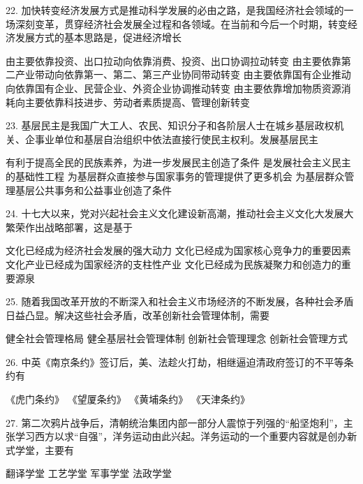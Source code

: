 22. 加快转变经济发展方式是推动科学发展的必由之路，是我国经济社会领域的一场深刻变革，贯穿经济社会发展全过程和各领域。在当前和今后一个时期，转变经济发展方式的基本思路是，促进经济增长
\begin{choices}
	 由主要依靠投资、出口拉动向依靠消费、投资、出口协调拉动转变
	 由主要依靠第二产业带动向依靠第一、第二、第三产业协同带动转变
	 由主要依靠国有企业推动向依靠国有企业、民营企业、外资企业协调推动转变
	 由主要依靠增加物质资源消耗向主要依靠科技进步、劳动者素质提高、管理创新转变
\end{choices}

23. 基层民主是我国广大工人、农民、知识分子和各阶层人士在城乡基层政权机关、企事业单位和基层自治组织中依法直接行使民主权利。发展基层民主
\begin{choices}
	 有利于提高全民的民族素养，为进一步发展民主创造了条件
	 是发展社会主义民主的基础性工程
	 为基层群众直接参与国家事务的管理提供了更多机会
	 为基层群众管理基层公共事务和公益事业创造了条件
\end{choices}

24. 十七大以来，党对兴起社会主义文化建设新高潮，推动社会主义文化大发展大繁荣作出战略部署，这是基于
\begin{choices}
	 文化已经成为经济社会发展的强大动力
	 文化已经成为国家核心竞争力的重要因素
	 文化产业已经成为国家经济的支柱性产业
	 文化已经成为民族凝聚力和创造力的重要源泉
\end{choices}

25. 随着我国改革开放的不断深入和社会主义市场经济的不断发展，各种社会矛盾日益凸显。解决这些社会矛盾，改革创新社会管理体制，需要
\begin{choices}
	 健全社会管理格局
	 健全基层社会管理体制
	 创新社会管理理念
	 创新社会管理方式
\end{choices}

26. 中英《南京条约》签订后，美、法趁火打劫，相继逼迫清政府签订的不平等条约有
\begin{choices}
	 《虎门条约》
	 《望厦条约》
	 《黄埔条约》
	 《天津条约》
\end{choices}

27. 第二次鸦片战争后，清朝统治集团内部一部分人震惊于列强的“船坚炮利”，主张学习西方以求“自强”，洋务运动由此兴起。洋务运动的一个重要内容就是创办新式学堂，主要有
\begin{choices}
	 翻译学堂
	 工艺学堂
	 军事学堂
	 法政学堂
\end{choices}

